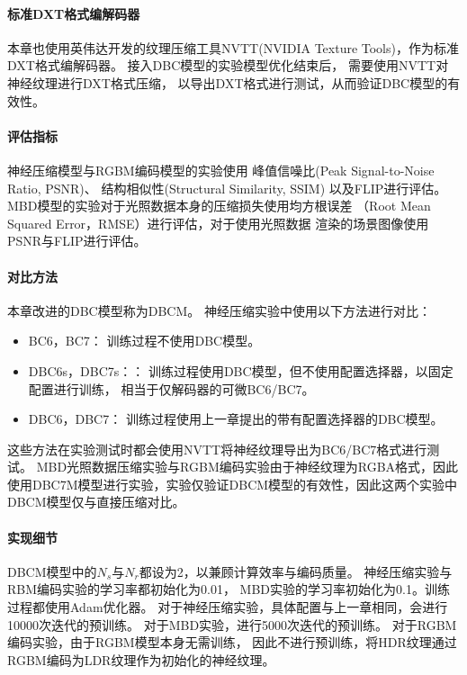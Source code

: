 \paragraph{标准DXT格式编解码器}

本章也使用英伟达开发的纹理压缩工具NVTT(NVIDIA Texture Tools)，作为标准DXT格式编解码器。
接入DBC模型的实验模型优化结束后，
需要使用NVTT对神经纹理进行DXT格式压缩，
以导出DXT格式进行测试，从而验证DBC模型的有效性。

\paragraph{评估指标}

神经压缩模型与RGBM编码模型的实验使用
峰值信噪比(Peak Signal-to-Noise Ratio, PSNR)、
结构相似性\cite{wang2004image}(Structural Similarity, SSIM)
以及FLIP\cite{andersson2020flip}进行评估。
MBD模型的实验对于光照数据本身的压缩损失使用均方根误差
（Root Mean Squared Error，RMSE）进行评估，对于使用光照数据
渲染的场景图像使用PSNR与FLIP进行评估。


\paragraph{对比方法}

本章改进的DBC模型称为DBCM。
神经压缩实验中使用以下方法进行对比：

\begin{itemize}
    \item BC6，BC7： 训练过程不使用DBC模型。
    \item DBC6s，DBC7s：： 训练过程使用DBC模型，但不使用配置选择器，以固定配置进行训练，
    相当于仅解码器的可微BC6/BC7。
    \item DBC6，DBC7： 训练过程使用上一章提出的带有配置选择器的DBC模型。    
\end{itemize}

这些方法在实验测试时都会使用NVTT将神经纹理导出为BC6/BC7格式进行测试。
MBD光照数据压缩实验与RGBM编码实验由于神经纹理为RGBA格式，因此
使用DBC7M模型进行实验，实验仅验证DBCM模型的有效性，因此这两个实验中
DBCM模型仅与直接压缩对比。

\paragraph{实现细节}

DBCM模型中的$N_s$与$N_r$都设为2，以兼顾计算效率与编码质量。
神经压缩实验与RBM编码实验的学习率都初始化为0.01，
MBD实验的学习率初始化为0.1。训练过程都使用Adam优化器。
对于神经压缩实验，具体配置与上一章相同，会进行10000次迭代的预训练。
对于MBD实验，进行5000次迭代的预训练。
对于RGBM编码实验，由于RGBM模型本身无需训练，
因此不进行预训练，将HDR纹理通过RGBM编码为LDR纹理作为初始化的神经纹理。


